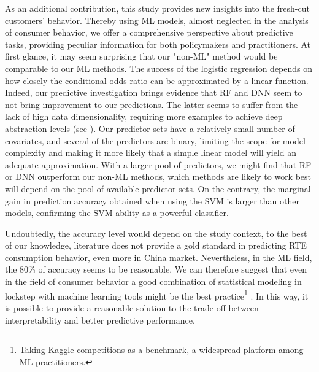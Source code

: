 \documentclass[a4,12pt]{article}
\begin{document}
As an additional contribution, this study provides new insights into the fresh-cut customers' behavior. Thereby using ML models, almost neglected in the analysis of consumer behavior, we offer a comprehensive perspective about predictive tasks, providing peculiar information for both policymakers and practitioners.
At first glance, it may seem surprising that our "non-ML" method would be comparable to our ML methods. 
The success of the logistic regression depends on how closely the conditional odds ratio can be approximated by a linear function. Indeed, our predictive investigation brings evidence that RF and DNN seem to not bring improvement to our predictions.  The latter seems to suffer from the lack of high data dimensionality, requiring more examples to achieve deep abstraction levels (see \cite{Lucun15}).
Our predictor sets have a relatively small number of covariates, and several of the predictors are binary, limiting the scope for model complexity and making it more likely that a simple linear model will yield an adequate approximation. With a larger pool of predictors, we might find that RF or DNN outperform our non-ML methods, which methods are likely to work best will depend on the pool of available predictor sets.
On the contrary, the marginal gain in prediction accuracy obtained when using the SVM is larger than other models, confirming the SVM ability as a powerful classifier.

Undoubtedly, the accuracy level would depend on the study context, to the best of our knowledge, literature does not provide a gold standard in predicting RTE  consumption behavior, even more in China market. Nevertheless, in the ML field, the 80\% of accuracy seems to be reasonable. We can therefore suggest that even in the field of consumer behavior a good combination of statistical modeling in lockstep with machine learning tools might be the best practice\footnote{Taking Kaggle competitions as a benchmark, a widespread platform among ML practitioners.} . In this way, it is possible to provide a reasonable solution to the trade-off between interpretability and better predictive performance.
\end{document}
